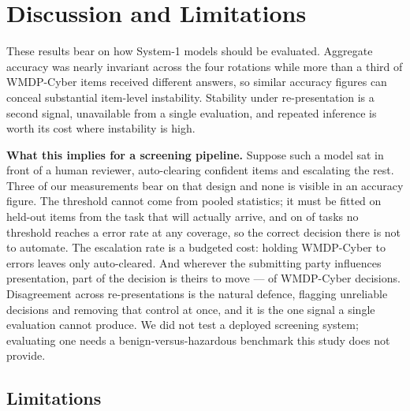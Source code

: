 \documentclass[conference,compsoc]{IEEEtran}
\begin{document}
\section{Discussion and Limitations}

These results bear on how System-1 models should be evaluated. Aggregate accuracy was
nearly invariant across the four rotations while more than a third of WMDP-Cyber items
received different answers, so similar accuracy figures can conceal substantial item-level
instability. Stability under re-presentation is a second signal, unavailable from a single
evaluation, and repeated inference is worth its cost where instability is high.

\textbf{What this implies for a screening pipeline.} Suppose such a model sat in front of a
human reviewer, auto-clearing confident items and escalating the rest. Three of our
measurements bear on that design and none is visible in an accuracy figure. The threshold
cannot come from pooled statistics; it must be fitted on held-out items from the task that
will actually arrive, and on \statThrNUnachievable{} of \statThrNDatasets{} tasks no
threshold reaches a \statThrTarget{} error rate at any coverage, so the correct decision
there is not to automate. The escalation rate is a budgeted cost: holding WMDP-Cyber to
\statThrTarget{} errors leaves only \statThrCovCyber{} auto-cleared. And wherever the
submitting party influences presentation, part of the decision is theirs to move ---
\statAtkSteerRotCyber{} of WMDP-Cyber decisions. Disagreement across re-presentations is
the natural defence, flagging unreliable decisions and removing that control at once, and
it is the one signal a single evaluation cannot produce. We did not test a deployed
screening system; evaluating one needs a benign-versus-hazardous benchmark this study does
not provide.

\subsection{Limitations}
\end{document}

